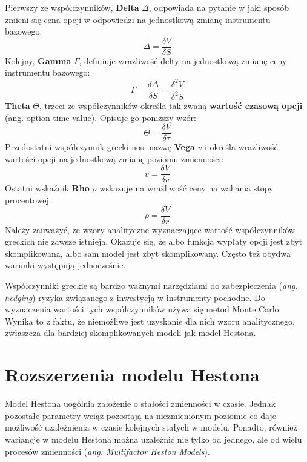\documentclass{pracamgr}
\begin{document}
Pierwszy ze współczynników, \textbf{Delta} $\Delta$, odpowiada na pytanie w jaki 
sposób zmieni się cena opcji w odpowiedzi na
jednostkową zmianę instrumentu bazowego:
\begin{equation}
  \Delta = \frac{\delta V}{\delta S}
\end{equation} 
Kolejny, \textbf{Gamma} $\Gamma$, definiuje wrażliwość delty na 
jednostkową zmianę ceny instrumentu bazowego:
\begin{equation}
  \Gamma = \frac{\delta \Delta}{\delta S} = \frac{\delta^2 V}{\delta^2 S}
\end{equation}
\textbf{Theta} $\Theta$, trzeci ze współczynników określa tak 
zwaną \textbf{wartość czasową opcji} (ang. option time value).
Opisuje go poniższy wzór:
\begin{equation}
  \Theta = \frac{\delta V}{\delta \tau}
\end{equation}
Przedostatni współczynnik grecki nosi nazwę \textbf{Vega} $v$ i określa wrażliwość wartości 
opcji na jednostkową zmianę poziomu
zmienności:
\begin{equation}
  v = \frac{\delta V}{\delta v}
\end{equation}
Ostatni wskaźnik \textbf{Rho} $\rho$ wskazuje na wrażliwość ceny na wahania stopy procentowej:
\begin{equation}
  \rho = \frac{\delta V}{\delta r}
\end{equation}
Należy zauważyć, że wzory analityczne wyznaczające wartość współczynników greckich nie zawsze istnieją. 
Okazuje się, że albo funkcja wypłaty opcji jest zbyt skomplikowana, albo sam model jest zbyt 
skomplikowany. Często też obydwa warunki występują jednocześnie. 

Współczynniki greckie są bardzo ważnymi narzędziami 
do zabezpieczenia (\textit{ang. hedging}) ryzyka 
związanego z inwestycją w instrumenty pochodne.
Do wyznaczenia wartości tych współczynników używa się metod Monte Carlo. Wynika to z faktu, 
że niemożliwe jest uzyskanie dla nich wzoru analitycznego, 
zwłaszcza dla bardziej skomplikowanych modeli jak model Hestona.

\section{Rozszerzenia modelu Hestona}

Model Hestona uogólnia założenie o stałości zmienności w czasie. 
Jednak pozostałe parametry wciąż pozostają na niezmienionym poziomie
co daje możliwość uzależnienia w czasie kolejnych stałych w modelu.
Ponadto, również wariancję w modelu Hestona można uzależnić nie tylko 
od jednego, ale od wielu procesów zmienności (\textit{ang. Multifactor Heston Models}).
\end{document}
